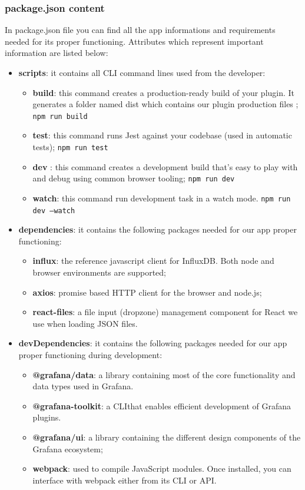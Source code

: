 		\subsubsection{package.json content}
In package.json file you can find all the app informations and requirements needed for its proper functioning. Attributes which represent important information are listed below:
		\begin{itemize}
			\item\textbf{scripts}: it contains all CLI command lines used from the developer: 
				\begin{itemize}
				\item\textbf{build}: this command creates a production-ready build of your plugin. It generates a folder named dist which contains our plugin production files ;
				\newline\texttt{npm run build}
				\item\textbf{test}: this command runs Jest against your codebase (used in automatic tests);
				\newline\texttt{npm run test}
				\item\textbf{dev} : this command creates a development build that's easy to play with and debug using common browser tooling;
				\newline\texttt{npm run dev}
				\item\textbf{watch}: this command run development task in a watch mode.
				\newline\texttt{npm run dev --watch}
			\end{itemize}
			\item\textbf{dependencies}: it contains the following packages needed for our app proper functioning:
			\begin{itemize}
				\item\textbf{influx}: the reference javascript client for InfluxDB. Both node and browser environments are supported;
    			\item\textbf{axios}: promise based HTTP client for the browser and node.js;
    			\item\textbf{react-files}: a file input (dropzone) management component for React we use when loading JSON files.
			\end{itemize}
			\item\textbf{devDependencies}: it contains the following packages needed for our app proper functioning during development:
			\begin{itemize}
				\item\textbf{@grafana/data}: a library containing most of the core functionality and data types used in Grafana.
				\item\textbf{@grafana-toolkit}: a CLI\glo that enables efficient development of Grafana plugins.
				\item\textbf{@grafana/ui}: a library containing the different design components of the Grafana ecosystem;
				\item\textbf{webpack}: used to compile JavaScript modules. Once installed, you can interface with webpack either from its CLI or API.
			\end{itemize}
		\end{itemize}
		
